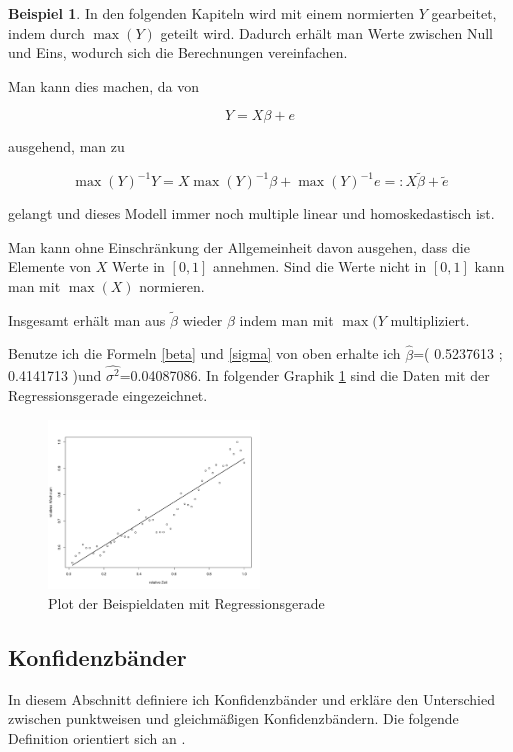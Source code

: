 \documentclass[12pt,a4paper]{article}
\theoremstyle{definition}
\newtheorem{Beispiel}[Definition]{Beispiel}
\theoremstyle{definition}
\theoremstyle{definition}
\newcommand{\betaoneest}{( 0.5237613 ; 0.4141713 )}
\newcommand{\sigmaoneest}{0.04087086}
\begin{document}
\begin{Beispiel}
In den folgenden Kapiteln wird mit einem normierten $Y$ gearbeitet, indem durch $\max(Y)$ geteilt wird. Dadurch erhält man Werte zwischen Null und Eins, wodurch sich die Berechnungen vereinfachen.

Man kann dies machen, da von 

\begin{equation*}
Y=X\beta+e
\end{equation*}

ausgehend, man zu 

\begin{equation*}
\max(Y)^{-1} Y = X \max(Y)^{-1} \beta + \max(Y)^{-1} e =: X \tilde{\beta} + \tilde{e}
\end{equation*}

gelangt und dieses Modell immer noch multiple linear und homoskedastisch ist. 

Man kann ohne Einschränkung der Allgemeinheit davon ausgehen, dass die Elemente von $X$ Werte in $[0,1]$ annehmen. Sind die Werte nicht in $[0,1]$ kann man mit $\max(X)$ normieren.

Insgesamt erhält man aus $\tilde{\beta}$ wieder $\beta$ indem man mit $\max(Y$ multipliziert.  

Benutze ich die Formeln \eqref{beta} und \eqref{sigma} von oben erhalte ich $\hat{\beta}$=\betaoneest und $\widehat{\sigma^2}$=\sigmaoneest. In folgender Graphik \ref{Beispieldaten_Regressionsgerade} sind die Daten mit der Regressionsgerade eingezeichnet.

\begin{figure}[H] 
  \centering
     \includegraphics[width=0.5\textwidth]{regression-gerade}
  \caption{Plot der Beispieldaten mit Regressionsgerade}
  \label{Beispieldaten_Regressionsgerade}
\end{figure}
 
\end{Beispiel} 



\subsection{Konfidenzbänder}
\label{Konfidenzbaender}
In diesem Abschnitt definiere ich Konfidenzbänder und erkläre den Unterschied zwischen punktweisen und gleichmäßigen Konfidenzbändern. Die folgende Definition orientiert sich an \cite{Georgii09}.
\end{document}
